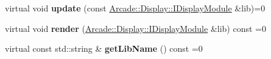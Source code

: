 \begin{DoxyCompactItemize}
virtual void {\bfseries update} (const \mbox{\hyperlink{classArcade_1_1Display_1_1IDisplayModule}{Arcade\+::\+Display\+::\+I\+Display\+Module}} \&lib)=0
\item 
\mbox{\label{classArcade_1_1Games_1_1IGameModule_afd5ec66681e77038e3d4dc17f43e1ee9}} 
virtual void {\bfseries render} (\mbox{\hyperlink{classArcade_1_1Display_1_1IDisplayModule}{Arcade\+::\+Display\+::\+I\+Display\+Module}} \&lib) const =0
\item 
\mbox{\label{classArcade_1_1Games_1_1IGameModule_a30966cbaa00abbd2a211cf152ea595f2}} 
virtual const std\+::string \& {\bfseries get\+Lib\+Name} () const =0
\end{DoxyCompactItemize}
